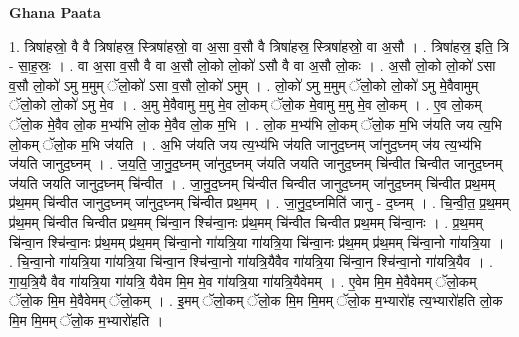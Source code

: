 \documentclass[17pt]{extarticle}
\begin{document}
\textbf{Ghana Paata } \newline

1. त्रिषा॑हस्रो॒ वै वै त्रिषा॑हस्र॒ स्त्रिषा॑हस्रो॒ वा अ॒सा व॒सौ वै त्रिषा॑हस्र॒ स्त्रिषा॑हस्रो॒ वा अ॒सौ । . त्रिषा॑हस्र॒ इति॒ त्रि - सा॒ह॒स्रः॒ । . वा अ॒सा व॒सौ वै वा अ॒सौ लो॒को लो॒को॑ ऽसौ वै वा अ॒सौ लो॒कः । . अ॒सौ लो॒को लो॒को॑ ऽसा व॒सौ लो॒को॑ ऽमु म॒मुम् ॅलो॒को॑ ऽसा व॒सौ लो॒को॑ ऽमुम् । . लो॒को॑ ऽमु म॒मुम् ॅलो॒को लो॒को॑ ऽमु मे॒वैवामुम् ॅलो॒को लो॒को॑ ऽमु मे॒व । . अ॒मु मे॒वैवामु म॒मु मे॒व लो॒कम् ॅलो॒क मे॒वामु म॒मु मे॒व लो॒कम् । . ए॒व लो॒कम् ॅलो॒क मे॒वैव लो॒क म॒भ्य॑भि लो॒क मे॒वैव लो॒क म॒भि । . लो॒क म॒भ्य॑भि लो॒कम् ॅलो॒क म॒भि ज॑यति जय त्य॒भि लो॒कम् ॅलो॒क म॒भि ज॑यति । . अ॒भि ज॑यति जय त्य॒भ्य॑भि ज॑यति जानुद॒घ्नम् जा॑नुद॒घ्नम् ज॑य त्य॒भ्य॑भि ज॑यति जानुद॒घ्नम् । . ज॒य॒ति॒ जा॒नु॒द॒घ्नम् जा॑नुद॒घ्नम् ज॑यति जयति जानुद॒घ्नम् चि॑न्वीत चिन्वीत जानुद॒घ्नम् ज॑यति जयति जानुद॒घ्नम् चि॑न्वीत । . जा॒नु॒द॒घ्नम् चि॑न्वीत चिन्वीत जानुद॒घ्नम् जा॑नुद॒घ्नम् चि॑न्वीत प्रथ॒मम् प्र॑थ॒मम् चि॑न्वीत जानुद॒घ्नम् जा॑नुद॒घ्नम् चि॑न्वीत प्रथ॒मम् । . जा॒नु॒द॒घ्नमिति॑ जानु - द॒घ्नम् । . चि॒न्वी॒त॒ प्र॒थ॒मम् प्र॑थ॒मम् चि॑न्वीत चिन्वीत प्रथ॒मम् चि॑न्वा॒न श्चि॑न्वा॒नः प्र॑थ॒मम् चि॑न्वीत चिन्वीत प्रथ॒मम् चि॑न्वा॒नः । . प्र॒थ॒मम् चि॑न्वा॒न श्चि॑न्वा॒नः प्र॑थ॒मम् प्र॑थ॒मम् चि॑न्वा॒नो गा॑यत्रि॒या गा॑यत्रि॒या चि॑न्वा॒नः प्र॑थ॒मम् प्र॑थ॒मम् चि॑न्वा॒नो गा॑यत्रि॒या । . चि॒न्वा॒नो गा॑यत्रि॒या गा॑यत्रि॒या चि॑न्वा॒न श्चि॑न्वा॒नो गा॑यत्रि॒यैवैव गा॑यत्रि॒या चि॑न्वा॒न श्चि॑न्वा॒नो गा॑यत्रि॒यैव । . गा॒य॒त्रि॒यै वैव गा॑यत्रि॒या गा॑यत्रि॒ यैवेम मि॒म मे॒व गा॑यत्रि॒या गा॑यत्रि॒यैवेमम् । . ए॒वेम मि॒म मे॒वैवेमम् ॅलो॒कम् ॅलो॒क मि॒म मे॒वैवेमम् ॅलो॒कम् । . इ॒मम् ॅलो॒कम् ॅलो॒क मि॒म मि॒मम् ॅलो॒क म॒भ्यारो॑ह त्य॒भ्यारो॑हति लो॒क मि॒म मि॒मम् ॅलो॒क म॒भ्यारो॑हति । \newline
\end{document}
